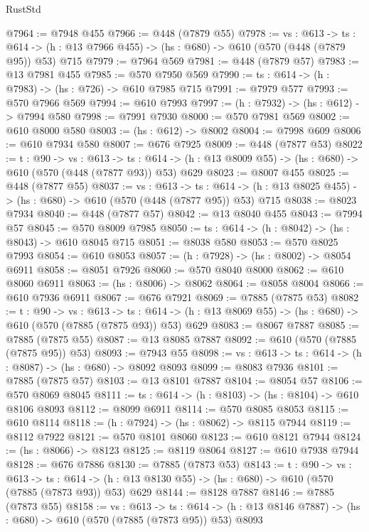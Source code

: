 \begin{lexlean}{RustStd}
\begin{coremodule}
@7964 := @7948 @455
@7966 := @448 (@7879 @55)
@7978 := {vs : @613} ->
  {ts : @614} -> (h : @13 @7966 @455) -> (hs : @680) -> @610 (@570 (@448 (@7879 @95)) @53) @715
@7979 := @7964 @569
@7981 := @448 (@7879 @57)
@7983 := @13 @7981 @455
@7985 := @570 @7950 @569
@7990 := {ts : @614} -> (h : @7983) -> (hs : @726) -> @610 @7985 @715
@7991 := @7979 @577
@7993 := @570 @7966 @569
@7994 := @610 @7993
@7997 := (h : @7932) -> (hs : @612) -> @7994 @580
@7998 := @7991 @7930
@8000 := @570 @7981 @569
@8002 := @610 @8000 @580
@8003 := (hs : @612) -> @8002
@8004 := @7998 @609
@8006 := @610 @7934 @580
@8007 := @676 @7925
@8009 := @448 (@7877 @53)
@8022 := {t : @90} ->
  {vs : @613} ->
  {ts : @614} -> (h : @13 @8009 @55) -> (hs : @680) -> @610 (@570 (@448 (@7877 @93)) @53) @629
@8023 := @8007 @455
@8025 := @448 (@7877 @55)
@8037 := {vs : @613} ->
  {ts : @614} -> (h : @13 @8025 @455) -> (hs : @680) -> @610 (@570 (@448 (@7877 @95)) @53) @715
@8038 := @8023 @7934
@8040 := @448 (@7877 @57)
@8042 := @13 @8040 @455
@8043 := @7994 @57
@8045 := @570 @8009 @7985
@8050 := {ts : @614} -> (h : @8042) -> (hs : @8043) -> @610 @8045 @715
@8051 := @8038 @580
@8053 := @570 @8025 @7993
@8054 := @610 @8053
@8057 := (h : @7928) -> (hs : @8002) -> @8054 @6911
@8058 := @8051 @7926
@8060 := @570 @8040 @8000
@8062 := @610 @8060 @6911
@8063 := (hs : @8006) -> @8062
@8064 := @8058 @8004
@8066 := @610 @7936 @6911
@8067 := @676 @7921
@8069 := @7885 (@7875 @53)
@8082 := {t : @90} ->
  {vs : @613} ->
  {ts : @614} -> (h : @13 @8069 @55) -> (hs : @680) -> @610 (@570 (@7885 (@7875 @93)) @53) @629
@8083 := @8067 @7887
@8085 := @7885 (@7875 @55)
@8087 := @13 @8085 @7887
@8092 := @610 (@570 (@7885 (@7875 @95)) @53)
@8093 := @7943 @55
@8098 := {vs : @613} -> {ts : @614} -> (h : @8087) -> (hs : @680) -> @8092 @8093
@8099 := @8083 @7936
@8101 := @7885 (@7875 @57)
@8103 := @13 @8101 @7887
@8104 := @8054 @57
@8106 := @570 @8069 @8045
@8111 := {ts : @614} -> (h : @8103) -> (hs : @8104) -> @610 @8106 @8093
@8112 := @8099 @6911
@8114 := @570 @8085 @8053
@8115 := @610 @8114
@8118 := (h : @7924) -> (hs : @8062) -> @8115 @7944
@8119 := @8112 @7922
@8121 := @570 @8101 @8060
@8123 := @610 @8121 @7944
@8124 := (hs : @8066) -> @8123
@8125 := @8119 @8064
@8127 := @610 @7938 @7944
@8128 := @676 @7886
@8130 := @7885 (@7873 @53)
@8143 := {t : @90} ->
  {vs : @613} ->
  {ts : @614} -> (h : @13 @8130 @55) -> (hs : @680) -> @610 (@570 (@7885 (@7873 @93)) @53) @629
@8144 := @8128 @7887
@8146 := @7885 (@7873 @55)
@8158 := {vs : @613} ->
  {ts : @614} -> (h : @13 @8146 @7887) -> (hs : @680) -> @610 (@570 (@7885 (@7873 @95)) @53) @8093

\end{coremodule}
\end{lexlean}
